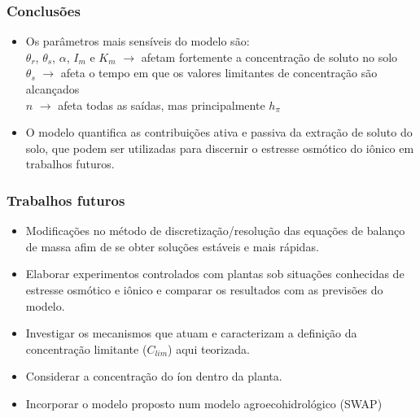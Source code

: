 \begin{frame}
\frametitle{Conclusões}
\begin{itemize}
  \item Os parâmetros mais sensíveis do modelo são: \\
    $\theta_r$, $\theta_s$, $\alpha$, $I_m$ e $K_m$ $\rightarrow$ afetam fortemente a concentração de soluto no solo\\
    $\theta_s$ $\rightarrow$ afeta o tempo em que os valores limitantes de concentração são alcançados\\
    $n$ $\rightarrow$ afeta todas as saídas, mas principalmente $h_\pi$

  \item O modelo quantifica as contribuições ativa e passiva da extração de soluto do solo, que podem ser utilizadas para discernir o estresse osmótico do iônico em trabalhos futuros.
        


\end{itemize}
\end{frame}

\begin{frame}\frametitle{Trabalhos futuros}
  \begin{itemize}
    \item Modificações no método de discretização/resolução das equações de balanço de massa afim de se obter soluções estáveis e mais rápidas.
    \item Elaborar experimentos controlados com plantas sob situações conhecidas de estresse osmótico e iônico e comparar os resultados com as previsões do modelo. 
    \item Investigar os mecanismos que atuam e caracterizam a definição da concentração limitante ($C_{lim}$) aqui teorizada.
    \item Considerar a concentração do íon dentro da planta.
    \item Incorporar o modelo proposto num modelo agroecohidrológico (SWAP)
  \end{itemize}

\end{frame}
